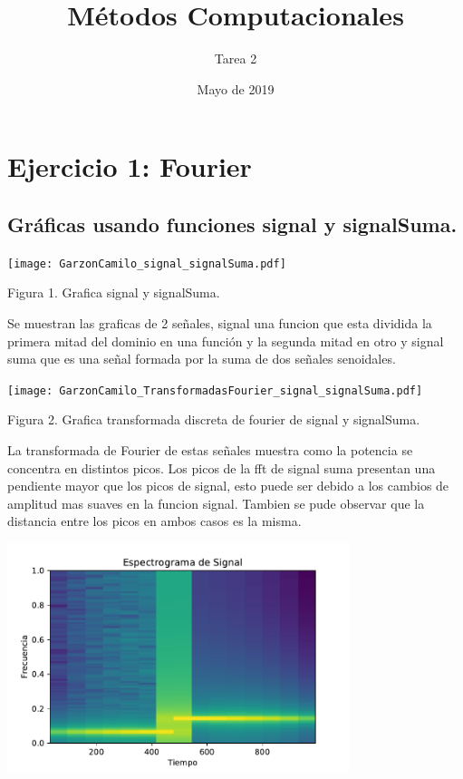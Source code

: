 \documentclass{article}
\title{Métodos Computacionales}
\author{Tarea 2}
\date{Mayo de 2019}
\begin{document}
\maketitle
\section{Ejercicio 1: Fourier} 
\vspace{5mm}
\subsection{    Gráficas usando funciones signal y signalSuma.} 
\vspace{5mm}
\begin{center}
\texttt{[image: GarzonCamilo\_signal\_signalSuma.pdf]} 

Figura 1. Grafica signal y signalSuma.
\begin{flushleft}
Se muestran las graficas de 2 señales, signal una funcion que esta dividida la primera mitad del dominio en una función y la segunda mitad en otro y signal suma que es una señal formada por la suma de dos señales senoidales.
\end{flushleft}
\texttt{[image: GarzonCamilo\_TransformadasFourier\_signal\_signalSuma.pdf]} 

Figura 2. Grafica transformada discreta de fourier de signal y signalSuma.
\begin{flushleft}
La transformada de Fourier de estas señales muestra como la potencia se concentra en distintos picos. Los picos de la fft de signal suma presentan una pendiente mayor que los picos de signal, esto puede ser debido a los cambios de amplitud mas suaves en la funcion signal. Tambien se pude observar que la distancia entre los picos en ambos casos es la misma.
\end{flushleft}
\includegraphics[width=10cm]{GarzonCamilo_espectograma_signal.pdf} 



\end{center}
\end{document}
